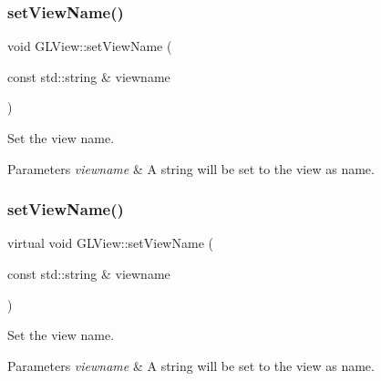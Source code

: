 \mbox{\label{classGLView_abc3a9132adea8262abaa85dc4f63830f}} 
\subsubsection{\texorpdfstring{set\+View\+Name()}{setViewName()}\hspace{0.1cm}{\footnotesize\ttfamily [1/2]}}
{\footnotesize\ttfamily void G\+L\+View\+::set\+View\+Name (\begin{DoxyParamCaption}\item[{const std\+::string \&}]{viewname }\end{DoxyParamCaption})\hspace{0.3cm}{\ttfamily [virtual]}}

Set the view name.


\begin{DoxyParams}{Parameters}
{\em viewname} & A string will be set to the view as name. \\
\hline
\end{DoxyParams}
\mbox{\label{classGLView_a141e0fbac581ef3404a8d57cc7e8453f}} 
\subsubsection{\texorpdfstring{set\+View\+Name()}{setViewName()}\hspace{0.1cm}{\footnotesize\ttfamily [2/2]}}
{\footnotesize\ttfamily virtual void G\+L\+View\+::set\+View\+Name (\begin{DoxyParamCaption}\item[{const std\+::string \&}]{viewname }\end{DoxyParamCaption})\hspace{0.3cm}{\ttfamily [virtual]}}

Set the view name.


\begin{DoxyParams}{Parameters}
{\em viewname} & A string will be set to the view as name. \\
\hline
\end{DoxyParams}
\mbox{\label{classGLView_ab19f26fc6123c51f48c2852b059eb676}} 
